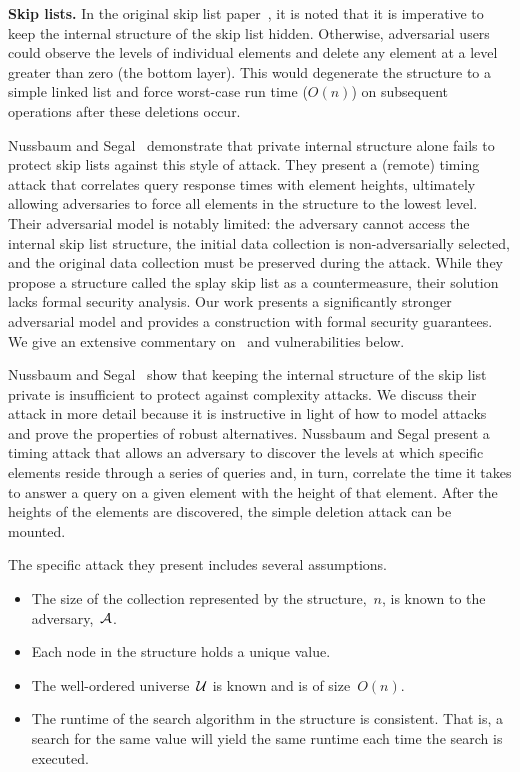 \textbf{Skip lists.} In the original skip list paper~\cite{pugh}, it is noted that it is imperative to keep the internal structure of the skip list hidden. Otherwise, adversarial users could observe the levels of individual elements and delete any element at a level greater than zero (the bottom layer). This would degenerate the structure to a simple linked list and force worst-case run time ($O(n)$) on subsequent operations after these deletions occur. 

Nussbaum and Segal~\cite{nussbaum2019skiplist} demonstrate that private internal structure alone fails to protect skip lists against this style of attack. They present a (remote) timing attack that correlates query response times with element heights, ultimately allowing adversaries to force all elements in the structure to the lowest level. Their adversarial model is notably limited: the adversary cannot access the internal skip list structure, the initial data collection is non-adversarially selected, and the original data collection must be preserved during the attack. While they propose a structure called the splay skip list as a countermeasure, their solution lacks formal security analysis. Our work presents a significantly stronger adversarial model and provides a construction with formal security guarantees. We give an extensive commentary on~\cite{nussbaum2019skiplist} and vulnerabilities below. 

Nussbaum and Segal~\cite{nussbaum2019skiplist} show that keeping the internal structure of the skip list private is insufficient to protect against complexity attacks. We discuss their attack in more detail because it is instructive in light of how to model attacks and prove the properties of robust alternatives.
Nussbaum and Segal present a timing attack that allows an adversary to discover the levels at which specific elements reside through a series of queries and, in turn, correlate the time it takes to answer a query on a given element with the height of that element. After the heights of the elements are discovered, the simple deletion attack can be mounted. 

The specific attack they present includes several assumptions.

\begin{itemize}
    \item The size of the collection represented by the structure,~$n$, is known to the adversary,~$\mathcal{A}$.
    \item Each node in the structure holds a unique value.
    \item The well-ordered universe~$\mathcal{U}$ is known and is of size~$O(n)$.
    \item The runtime of the search algorithm in the structure is consistent. That is, a search for the same value will yield the same runtime each time the search is executed.
\end{itemize}


